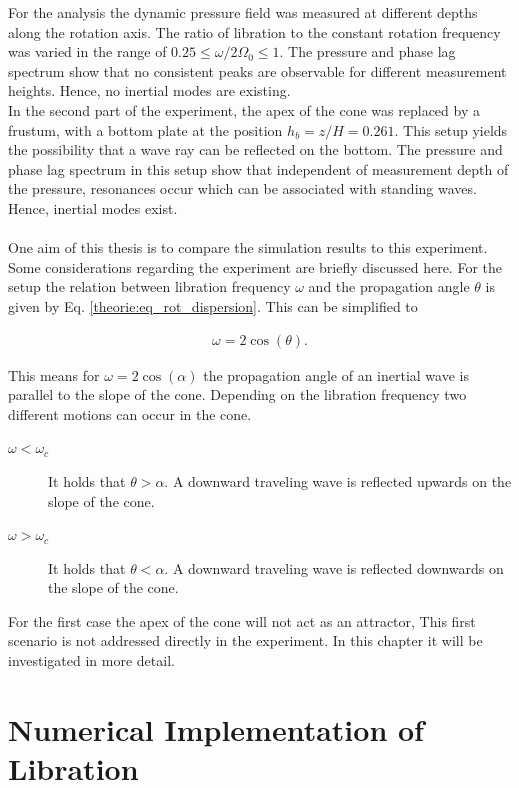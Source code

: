 For the analysis the dynamic pressure field was measured at different depths along the rotation axis.
The ratio of libration to the constant rotation frequency was varied in the range of ${0.25\leq\omega/2\Omega_0\leq1}$.
The pressure and phase lag spectrum  show that no consistent peaks are observable for different measurement heights.
Hence, no inertial modes are existing.
\\
In the second part of the experiment, the apex of the cone was replaced by a frustum,
with a bottom plate at the position $h_b=z/H = 0.261$.
This setup yields the possibility that a wave ray can be reflected on the bottom.
The pressure and phase lag spectrum in this setup show that
independent of measurement depth of the pressure, resonances occur which can be associated with standing waves.
Hence, inertial modes exist.
\\
\\
One aim of this thesis is to compare the simulation results to this experiment.
Some considerations regarding the experiment are briefly discussed here.
For the setup the relation between libration frequency $\omega$ and the propagation angle $\theta$
is given by Eq. \ref{theorie:eq_rot_dispersion}. This can be simplified to

\begin{align}
    \omega = 2\cos(\theta).
\end{align}

This means for $\omega = 2\cos(\alpha)$ the propagation angle of an inertial wave is parallel to the slope of the cone.
Depending on the libration frequency two different motions can occur in the cone.

\begin{description}
    \item[$\omega < \omega_c$]{It holds that $\theta > \alpha$. A downward traveling wave is reflected upwards on the slope of the cone.}
    \item[$\omega > \omega_c$]{It holds that $\theta < \alpha$. A downward traveling wave is reflected downwards on the slope of the cone.}
\end{description}

For the first case the apex of the cone will not act as an attractor,
This first scenario is not addressed directly in the experiment. In this chapter it will be investigated in more detail.

\section{Numerical Implementation of Libration}

